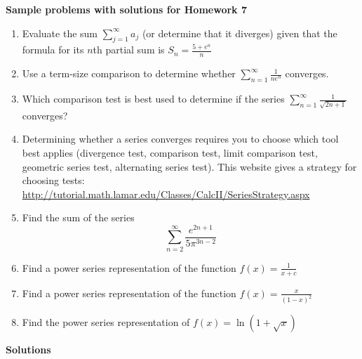 \documentclass{article}
\begin{document}
\begin{center}
\textbf{
    Sample problems with solutions for Homework 7}
\end{center}
    \begin{enumerate}
               \item Evaluate the sum $\displaystyle \sum_{j=1}^\infty a_j$ (or determine that it diverges) given that the formula for its $n$th partial sum is
                            $\displaystyle S_n = \frac{5 + e^n}{n}$
            \item Use a term-size comparison to determine whether $\displaystyle \sum_{n=1}^\infty \frac{1}{ne^n}$ converges.
            \item Which comparison test is best used to determine if the series $\displaystyle \sum_{n=1}^\infty \frac{1}{\sqrt{2n+1}}$ converges?
            \item Determining whether a series converges requires you to choose which tool best applies (divergence test, comparison test, limit comparison test, geometric series test, alternating series test). This website gives a strategy for choosing tests:\\ \url{http://tutorial.math.lamar.edu/Classes/CalcII/SeriesStrategy.aspx} 
            \item Find the sum of the series $$\sum_{n=2}^\infty \frac{e^{2n+1}}{5\pi^{3n-2}}$$
            \item Find a power series representation of the function $\displaystyle f(x) = \frac{1}{x+c}$
            \item Find a power series representation of the function $\displaystyle f(x) = \frac{x}{(1-x)^2}$
            \item Find the power series representation of $f(x) = \ln(1+\sqrt{x})$
    \end{enumerate}
    \begin{center}
        \textbf{\Large{Solutions}}
    \end{center}
\end{document}
